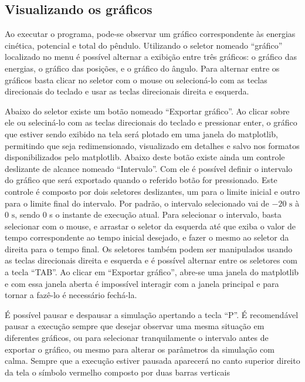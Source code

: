 \documentclass[12pt]{article}
\begin{document}
    \subsection*{Visualizando os gráficos}
    Ao executar o programa, pode-se observar um gráfico correspondente às energias cinética, potencial e total do pêndulo.
    Utilizando o seletor nomeado ``gráfico'' localizado no menu é possível alternar a exibição entre três gráficos: o gráfico das energias,
    o gráfico das posições, e o gráfico do ângulo. Para alternar entre os gráficos basta clicar no seletor com o mouse ou selecioná-lo com
    as teclas direcionais do teclado e usar as teclas direcionais direita e esquerda.
    \par Abaixo do seletor existe um botão nomeado ``Exportar gráfico''. Ao clicar sobre ele ou seleciná-lo com as teclas direcionais
    do teclado e pressionar enter, o gráfico que estiver sendo exibido na tela será plotado em uma janela do matplotlib, permitindo que
    seja redimensionado, visualizado em detalhes e salvo nos formatos disponibilizados pelo matplotlib. Abaixo deste botão
    existe ainda um controle deslizante de alcance nomeado ``Intervalo''. Com ele é possível definir o intervalo do gráfico
    que será exportado quando o referido botão for pressionado. Este controle é composto por dois seletores deslizantes, um para
    o limite inicial e outro para o limite final do intervalo. Por padrão, o intervalo selecionado vai de $-20\text{ s}$ à $0\text{ s}$, 
    sendo 0 s o instante de execução atual. Para selecionar o intervalo, basta selecionar com o mouse,
    e arrastar o seletor da esquerda até que exiba o valor de tempo correspondente ao tempo inicial desejado, e fazer o mesmo
    ao seletor da direita para o tempo final. Os seletores também podem ser manipulados usando as teclas direcionais direita e esquerda
    e é possível alternar entre os seletores com a tecla ``TAB''. Ao clicar em ``Exportar gráfico'', abre-se uma janela do matplotlib
    e com essa janela aberta é impossível interagir com a janela principal e para tornar a fazê-lo é necessário fechá-la.
    \par É possível pausar e despausar a simulação apertando a tecla ``P''. É recomendável pausar a execução sempre que desejar
    observar uma mesma situação em diferentes gráficos, ou para selecionar tranquilamente o intervalo antes de exportar o gráfico,
    ou mesmo para alterar os parâmetros da simulação com calma.
    Sempre que a execução estiver pausada aparecerá no canto superior direito da tela o símbolo vermelho composto por duas barras verticais
\end{document}
